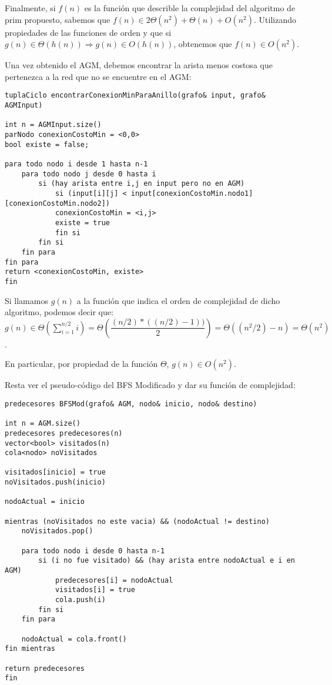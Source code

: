 \documentclass[10pt,a4paper]{article}
\begin{document}
Finalmente, si $f(n)$ es la función que describle la complejidad del algoritmo de prim propuesto, sabemos que $f(n) \in 2\Theta(n^2) + \Theta(n) +  O(n^2)$. Utilizando propiedades de las funciones de orden y que si $g(n) \in \Theta(h(n)) \Rightarrow g(n) \in O(h(n))$, obtenemos que $f(n) \in O(n^2)$.

Una vez obtenido el AGM, debemos encontrar la arista menos costosa que pertenezca a la red que no se encuentre en el AGM:

\begin{lstlisting}
tuplaCiclo encontrarConexionMinParaAnillo(grafo& input, grafo& AGMInput)

int n = AGMInput.size()
parNodo conexionCostoMin = <0,0>
bool existe = false;

para todo nodo i desde 1 hasta n-1
	para todo nodo j desde 0 hasta i
		si (hay arista entre i,j en input pero no en AGM)
			si (input[i][j] < input[conexionCostoMin.nodo1][conexionCostoMin.nodo2])
			conexionCostoMin = <i,j>
			existe = true
			fin si
		fin si
	fin para
fin para
return <conexionCostoMin, existe>
fin
\end{lstlisting}

Si llamamos $g(n)$ a la función que indica el orden de complejidad de dicho algoritmo, podemos decir que: 
$g(n) \in \Theta(\sum\limits_{i=1}^{n/2} i) = \Theta(\dfrac{(n/2)*((n/2) - 1))}{2}) = \Theta((n^2/2) - n) = \Theta(n^2)$. 

\noindent En particular, por propiedad de la función $\Theta$, $g(n) \in O(n^2)$.


Resta ver el pseudo-código del BFS Modificado y dar su función de complejidad:

\begin{lstlisting}
predecesores BFSMod(grafo& AGM, nodo& inicio, nodo& destino)

int n = AGM.size()
predecesores predecesores(n)
vector<bool> visitados(n)
cola<nodo> noVisitados

visitados[inicio] = true
noVisitados.push(inicio)

nodoActual = inicio

mientras (noVisitados no este vacia) && (nodoActual != destino)
	noVisitados.pop()
	
	para todo nodo i desde 0 hasta n-1
		si (i no fue visitado) && (hay arista entre nodoActual e i en AGM)
			predecesores[i] = nodoActual
			visitados[i] = true
			cola.push(i)
		fin si
	fin para
	
	nodoActual = cola.front()
fin mientras

return predecesores
fin
\end{lstlisting}
\end{document}
